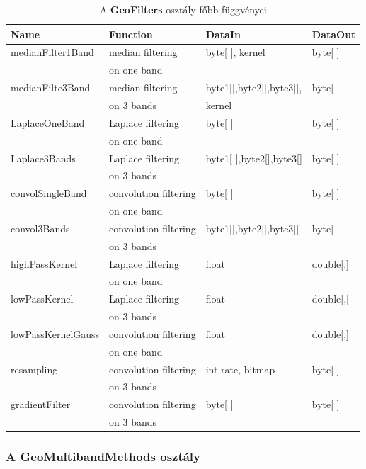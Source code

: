 \documentclass[a4paper,12pt]{article}
\begin{document}
\begin{table}
	\begin{small}	
		\begin{tabular}{|l|l|l|l|}
			\hline
			\textbf{Name} & \textbf{Function} & \textbf{DataIn} & \textbf{DataOut}\\	
			\hline
			medianFilter1Band & median filtering & byte[ ], kernel & byte[ ] \\
			& on one band&&\\
			\hline		
			medianFilte3Band & median filtering & byte1[],byte2[],byte3[], & byte[ ] \\
			&  on 3 bands&  kernel&\\
			\hline
			LaplaceOneBand & Laplace filtering & byte[ ] & byte[ ] \\
			&on one band&&\\
			\hline
			Laplace3Bands & Laplace filtering & byte1[ ],byte2[],byte3[] & byte[ ] \\
			&on 3 bands&&\\
			\hline
			convolSingleBand& convolution filtering & byte[ ] & byte[ ] \\
			&on one band&&\\
			\hline
			convol3Bands & convolution filtering & byte1[],byte2[],byte3[] & byte[ ] \\
			&on 3 bands&&\\
			\hline
			highPassKernel & Laplace filtering & float & double[,] \\
			&on one band&&\\
			\hline
			lowPassKernel & Laplace filtering & float & double[,] \\
			&on 3 bands&&\\
			\hline
			lowPassKernelGauss& convolution filtering & float & double[,] \\
			&on one band&&\\
			\hline
			resampling & convolution filtering & int rate, bitmap & byte[ ] \\
			&on 3 bands&&\\
			\hline
			gradientFilter & convolution filtering &byte[ ]  & byte[ ] \\
			&on 3 bands&&\\
			\hline
		\end{tabular}
	\end{small}
	\caption{A \textbf{GeoFilters} osztály főbb függvényei}
	\label{fig:GeoFilters}
\end{table}

\subsubsection{A \textbf{GeoMultibandMethods} osztály}
\end{document}
